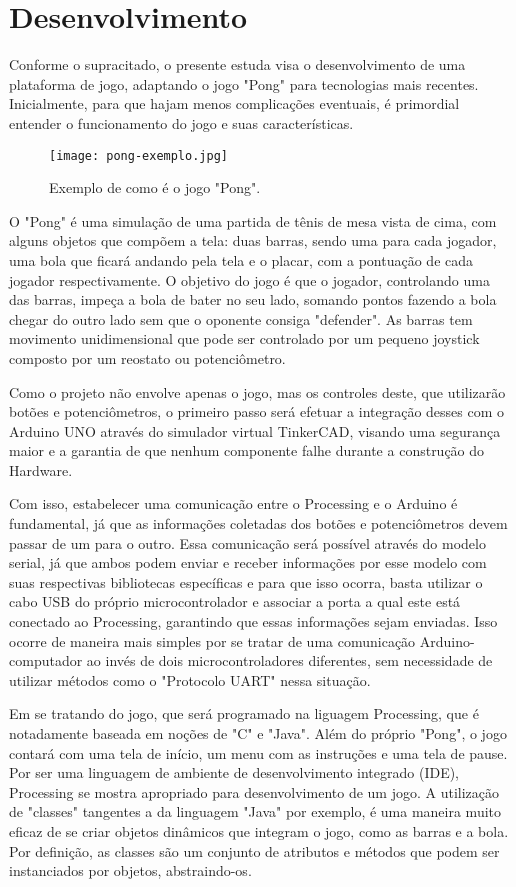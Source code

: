 \section{Desenvolvimento}
	
	Conforme o supracitado, o presente estuda visa o desenvolvimento de uma plataforma de jogo, adaptando o jogo "Pong" para tecnologias mais recentes. Inicialmente, para que hajam menos complicações eventuais, é primordial entender o funcionamento do jogo e suas características.

\begin{figure}[htbp]
     \centerline{
        \texttt{[image: pong-exemplo.jpg]}
        }
     \caption{Exemplo de como é o jogo "Pong".}
     \label{fig}
    \end{figure}

	O "Pong" é uma simulação de uma partida de tênis de mesa vista de cima, com alguns objetos que compõem a tela: duas barras, sendo uma para cada jogador, uma bola que ficará andando pela tela e o placar, com a pontuação de cada jogador respectivamente. O objetivo do jogo é que o jogador, controlando uma das barras, impeça a bola de bater no seu lado, somando pontos fazendo a bola chegar do outro lado sem que o oponente consiga "defender". As barras tem movimento unidimensional que pode ser controlado por um pequeno joystick composto por um reostato ou potenciômetro.

	Como o projeto não envolve apenas o jogo, mas os controles deste, que utilizarão botões e potenciômetros, o primeiro passo será efetuar a integração desses com o Arduino UNO através do simulador virtual TinkerCAD, visando uma segurança maior e a garantia de que nenhum componente falhe durante a construção do Hardware.

	Com isso, estabelecer uma comunicação entre o Processing e o Arduino é fundamental, já que as informações coletadas dos botões e potenciômetros devem passar de um para o outro. Essa comunicação será possível através do modelo serial, já que ambos podem enviar e receber informações por esse modelo com suas respectivas bibliotecas específicas e para que isso ocorra, basta utilizar o cabo USB do próprio microcontrolador e associar a porta a qual este está conectado ao Processing, garantindo que essas informações sejam enviadas. Isso ocorre de maneira mais simples por se tratar de uma comunicação Arduino-computador ao invés de dois microcontroladores diferentes, sem necessidade de utilizar métodos como o "Protocolo UART" nessa situação.
	
	Em se tratando do jogo, que será programado na liguagem Processing, que é notadamente baseada em noções de "C" e "Java". Além do próprio "Pong", o jogo contará com uma tela de início, um menu com as instruções e uma tela de pause. Por ser uma linguagem de ambiente de desenvolvimento integrado (IDE), Processing se mostra apropriado para desenvolvimento de um jogo. A utilização de "classes" tangentes a da linguagem "Java" por exemplo, é uma maneira muito eficaz de se criar objetos dinâmicos que integram o jogo, como as barras e a bola. Por definição, as classes são um conjunto de atributos e métodos que podem ser instanciados por objetos, abstraindo-os.

